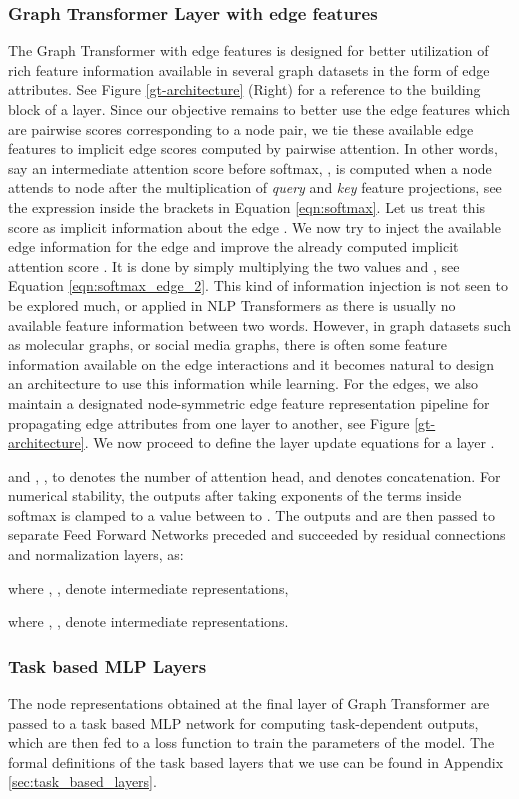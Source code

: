 \documentclass[letterpaper]{article} \usepackage{aaai21}  \usepackage{times}  \usepackage{helvet} \usepackage{courier}  \usepackage[hyphens]{url}  \usepackage{graphicx} \urlstyle{rm} \def\UrlFont{\rm}  \usepackage{natbib}  \usepackage{caption} \usepackage{xcolor}
\begin{document}
\subsubsection{Graph Transformer Layer with edge features} The Graph Transformer with edge features is designed for better utilization of rich feature information available in several graph datasets in the form of edge attributes. See Figure \ref{gt-architecture} (Right) for a reference to the building block of a layer. Since our objective remains to better use the edge features which are pairwise scores corresponding to a node pair, we tie these available edge features to implicit edge scores computed by pairwise attention. In other words, say an intermediate attention score before softmax, , is computed when a node  attends to node  after the 
multiplication of \textit{query} and \textit{key} feature projections, see the expression inside the brackets in Equation \ref{eqn:softmax}. Let us treat this score  as implicit information about the edge . We now try to inject the available edge information for the edge  and improve the already computed implicit attention score . It is done by simply multiplying the two values  and , see Equation \ref{eqn:softmax_edge_2}. This kind of information injection is not seen to be explored much, or applied in NLP Transformers as there is usually no available feature information between two words. However, in graph datasets such as molecular graphs, or social media graphs, there is often some feature information available on the edge interactions and it becomes natural to design an architecture to use this information while learning. For the edges,
we also maintain a designated node-symmetric edge feature representation pipeline for propagating edge attributes from one layer to another, see Figure \ref{gt-architecture}.
We now proceed to define the layer update equations for a layer . 



and , ,  to  denotes the number of attention head, and  denotes concatenation. 
For numerical stability, the outputs after taking exponents of the terms inside softmax is clamped to a value between  to .
The outputs  and  are then passed to separate Feed Forward Networks preceded and succeeded by residual connections and normalization layers, as:


where , ,  denote intermediate representations,

where , ,  denote intermediate representations. 


\subsubsection{Task based MLP Layers} 
The node representations obtained at the final layer of Graph Transformer are passed to a task based MLP network for computing task-dependent outputs, which are then fed to a loss function to train the parameters of the model. The formal definitions of the task based layers that we use can be found in Appendix \ref{sec:task_based_layers}.
\end{document}
